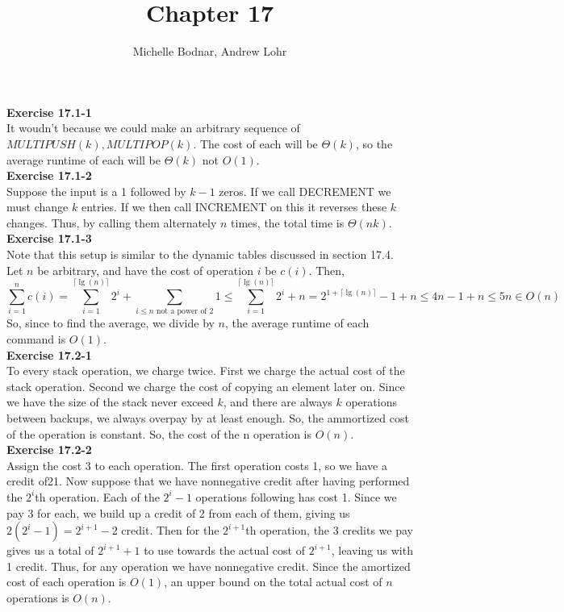 \documentclass{article}
\title{Chapter 17}
\author{Michelle Bodnar, Andrew Lohr}
\begin{document}
\maketitle


\noindent\textbf{Exercise 17.1-1}\\

It woudn't because we could make an arbitrary sequence of $MULTIPUSH(k), MULTIPOP(k)$. The cost of each will be $\Theta(k)$, so the average runtime of each will be $\Theta(k)$ not $O(1)$.\\

\noindent\textbf{Exercise 17.1-2}\\

Suppose the input is a 1 followed by $k-1$ zeros.  If we call DECREMENT we must change $k$ entries.  If we then call INCREMENT on this it reverses these $k$ changes.  Thus, by calling them alternately $n$ times, the total time is $\Theta(nk)$.\\

\noindent\textbf{Exercise 17.1-3}\\

Note that this setup is similar to the dynamic tables discussed in section 17.4. Let $n$ be arbitrary, and have the cost of operation $i$ be $c(i)$. Then,
\[
\sum_{i=1}^n c(i) = \sum_{i=1}^{\lceil\lg(n)\rceil} 2^i + \sum_{i\le n \mbox{ not a power of 2}} 1 \le \sum_{i=1}^{\lceil\lg(n)\rceil} 2^i + n = 2^{1 + \lceil\lg(n)\rceil} -1 + n \le 4n -1 +n \le 5n \in O(n)
\]
So, since to find the average, we divide by $n$, the average runtime of each command is $O(1)$.\\

\noindent\textbf{Exercise 17.2-1}\\

To every stack operation, we charge twice. First we charge the actual cost of the stack operation. Second we charge the cost of copying an element later on. Since we have the size of the stack never exceed $k$, and there are always $k$ operations between backups, we always overpay by at least enough. So, the ammortized cost of the operation is constant. So, the cost of the n operation is $O(n)$.\\

\noindent\textbf{Exercise 17.2-2}\\

Assign the cost 3 to each operation. The first operation costs 1, so we have a credit of21.  Now suppose that we have nonnegative credit after having performed the $2^{i}$th operation.  Each of the $2^{i}-1$ operations following has cost 1.  Since we pay 3 for each, we build up a credit of 2 from each of them, giving us $2(2^i-1) = 2^{i+1} - 2$ credit.  Then for the $2^{i+1}$th operation, the 3 credits we pay gives us a total of $2^{i+1} + 1$ to use towards the actual cost of $2^{i+1}$, leaving us with 1 credit.  Thus, for any operation we have nonnegative credit.  Since the amortized cost of each operation is $O(1)$, an upper bound on the total actual cost of $n$ operations is $O(n)$. \\
\end{document}
